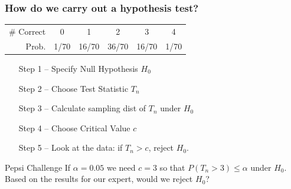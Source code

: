 \begin{frame}
  \frametitle{How do we carry out a hypothesis test?}
            \begin{center}
              \begin{tabular}{rccccc}
                \hline
                \# Correct & 0 & 1 & 2 & 3 & 4\\
                Prob.&1/70 & 16/70 & 36/70 & 16/70 &1/70\\
                \hline
              \end{tabular}
            \end{center}
  \begin{enumerate}
    \item[Step 1] -- Specify Null Hypothesis $H_0$
    \item[Step 2] -- Choose Test Statistic $T_n$ 
    \item[Step 3] -- Calculate sampling dist of $T_n$ under $H_0$
    \item[Step 4] -- Choose Critical Value $c$
    \item[Step 5] -- Look at the data: if $T_n >c$, reject $H_0$.
  \end{enumerate}

  \begin{alertblock}{Pepsi Challenge}
    If $\alpha = 0.05$ we need $c = 3$ so that $P(T_n >3) \leq \alpha$ under $H_0$.
    Based on the results for our expert, would we reject $H_0$?
  \end{alertblock}
\end{frame}

